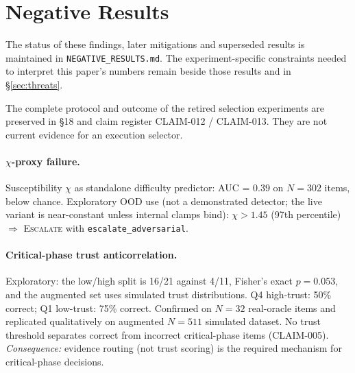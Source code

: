 \documentclass[10pt,twocolumn]{article}
\begin{document}
\section{Negative Results}
\label{sec:negative}

The status of these findings, later mitigations and superseded results
is maintained in \texttt{NEGATIVE\_RESULTS.md}. The experiment-specific
constraints needed to interpret this paper's numbers remain beside
those results and in \S\ref{sec:threats}.

The complete protocol and outcome of the retired selection experiments
are preserved in  \S18 and claim register
CLAIM-012 / CLAIM-013. They are not current evidence for an execution
selector.

\paragraph{$\chi$-proxy failure.}
Susceptibility $\chi$ as standalone difficulty predictor: AUC = 0.39
on $N=302$ items, below chance. Exploratory OOD use (not a demonstrated
detector; the live variant is near-constant unless internal clamps bind):
$\chi > 1.45$ (97th percentile) $\Rightarrow$ \textsc{Escalate} with
\texttt{escalate\_adversarial}.

\paragraph{Critical-phase trust anticorrelation.}
Exploratory: the low/high split is 16/21 against 4/11, Fisher's exact
$p = 0.053$, and the augmented set uses simulated trust distributions.
Q4 high-trust: 50\% correct; Q1 low-trust: 75\% correct.
Confirmed on $N=32$ real-oracle items and replicated qualitatively
on augmented $N=511$ simulated dataset. No trust threshold separates
correct from incorrect critical-phase items (CLAIM-005). \emph{Consequence:}
evidence routing (not trust scoring) is the required mechanism for
critical-phase decisions.
\end{document}
